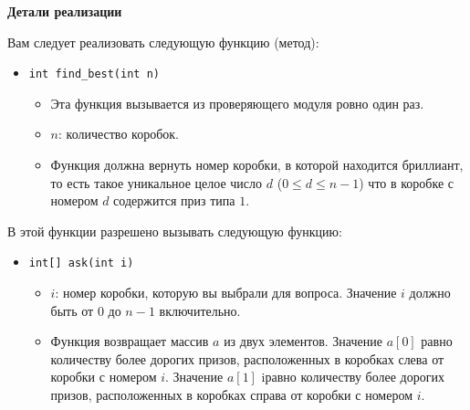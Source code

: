 \textbf{Детали реализации}

Вам следует реализовать следующую функцию (метод):

\begin{itemize}
\item \texttt{int find\_best(int n)}
\begin{itemize}
\item Эта функция вызывается из проверяющего модуля ровно один раз.
\item $n$: количество коробок.
\item Функция должна вернуть номер коробки, в которой находится бриллиант, то есть такое
уникальное целое число $d$ ($0 \leq d \leq n - 1$) что в коробке с номером $d$ содержится приз типа $1$.
\end{itemize}
\end{itemize}

В этой функции разрешено вызывать следующую функцию:

\begin{itemize}
\item \texttt{int[] ask(int i)}
\begin{itemize}
\item $i$: номер коробки, которую вы выбрали для вопроса. Значение $i$ должно быть от $0$ до $n - 1$ включительно.
\item Функция возвращает массив $a$ из двух элементов. Значение $a[0]$ равно количеству более дорогих призов, расположенных в коробках слева от коробки с номером $i$.  Значение $a[1]$ iравно количеству более дорогих призов, расположенных в коробках справа от коробки с номером $i$.
\end{itemize}
\end{itemize}

